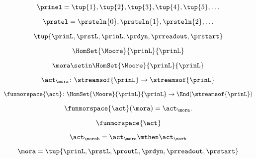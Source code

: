 \begin{forslides}
    \begin{equation}
        \label{eq:slides-processes-14}
        \prinel = \tup{1}, \tup{2}, \tup{3}, \tup{4}, \tup{5}, \ldots
    \end{equation}

    \begin{equation}
        \label{eq:slides-processes-15}
        \prstel = \prsteln{0}, \prsteln{1}, \prsteln{2}, \ldots
    \end{equation}

    \begin{equation}
        \label{eq:slides-processes-16}
        \tup{\prinL,\prstL,\prinL,\prdyn,\prreadout,\prstart}
    \end{equation}

    \begin{equation}
        \label{eq:slides-processes-17}
        \HomSet{\Moore}{\prinL}{\prinL}
    \end{equation}

    \begin{equation}
        \label{eq:slides-processes-18}
        \mora \setin \HomSet{\Moore}{\prinL}{\prinL}
    \end{equation}

    \begin{equation}
        \label{eq:slides-processes-19}
        \act_{\mora} \colon \streamsof{\prinL} \to \streamsof{\prinL}
    \end{equation}
    
    \begin{equation}
        \label{eq:slides-processes-20}
        \funmorspace{\act} \colon  \HomSet{\Moore}{\prinL}{\prinL} \to \End (\streamsof{\prinL})
    \end{equation}

    \begin{equation}
        \label{eq:slides-processes-21}
        \funmorspace{\act}(\mora) = \act_{\mora}.
    \end{equation}

    \begin{equation}
        \label{eq:slides-processes-22}
        \funmorspace{\act}
    \end{equation}

    \begin{equation}
        \label{eq:slides-processes-23}
        \act_{\morab} = \act_\mora \mthen \act_\morb
    \end{equation}

    \begin{equation}
        \label{eq:slides-processes-24}
        \mora = \tup{\prinL,\prstL,\proutL,\prdyn,\prreadout,\prstart}
    \end{equation}


\end{forslides}
